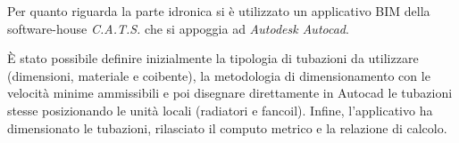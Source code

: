 Per quanto riguarda la parte idronica si è utilizzato un applicativo BIM della software-house \emph{C.A.T.S.} che si appoggia ad \emph{Autodesk Autocad}.

È stato possibile definire inizialmente la tipologia di tubazioni da utilizzare (dimensioni, materiale e coibente), la metodologia di dimensionamento con le velocità minime ammissibili e poi disegnare direttamente in Autocad le tubazioni stesse posizionando le unità locali (radiatori e fancoil). Infine, l'applicativo ha dimensionato le tubazioni, rilasciato il computo metrico e la relazione di calcolo.